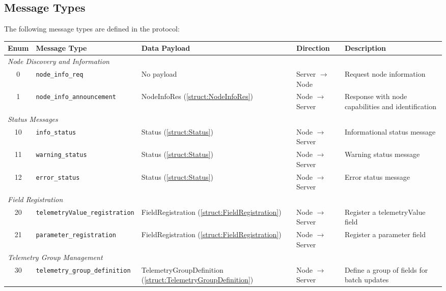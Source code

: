 \begin{landscape}
\pagestyle{landscape}
\section{Message Types}\label{sec:message-types}
The following message types are defined in the protocol:

\begin{center}
\begin{longtable}{c l l l  p{6cm}}
\toprule
\textbf{Enum} & \textbf{Message Type} & \textbf{Data Payload} & \textbf{Direction}&\textbf{Description} \\
\endhead
 
\multicolumn{5}{l}{\textit{Node Discovery and Information}} \\
0 & \texttt{node\_info\_req}\label{msg:node-info-req} & No payload & Server $\rightarrow$ Node & Request node information \\
1 & \texttt{node\_info\_announcement}\label{msg:node-info-announcement} & NodeInfoRes (\ref{struct:NodeInfoRes}) & Node $\rightarrow$ Server & Response with node capabilities and identification \\
\midrule
\multicolumn{5}{l}{\textit{Status Messages}} \\
10 & \texttt{info\_status}\label{msg:info-status} & Status (\ref{struct:Status}) & Node $\rightarrow$ Server & Informational status message \\
11 & \texttt{warning\_status}\label{msg:warning-status} & Status (\ref{struct:Status}) & Node $\rightarrow$ Server & Warning status message \\
12 & \texttt{error\_status}\label{msg:error-status} & Status (\ref{struct:Status}) & Node $\rightarrow$ Server & Error status message \\
\midrule
\multicolumn{5}{l}{\textit{Field Registration}} \\
20 & \texttt{telemetryValue\_registration}\label{msg:telemetryValue-registration} & FieldRegistration (\ref{struct:FieldRegistration}) & Node $\rightarrow$ Server & Register a telemetryValue field \\
21 & \texttt{parameter\_registration}\label{msg:parameter-registration} & FieldRegistration (\ref{struct:FieldRegistration}) & Node $\rightarrow$ Server & Register a parameter field \\
\midrule
\multicolumn{5}{l}{\textit{Telemetry Group Management}} \\
30 & \texttt{telemetry\_group\_definition}\label{msg:parameter-group-definition} & TelemetryGroupDefinition (\ref{struct:TelemetryGroupDefinition}) & Node $\rightarrow$ Server & Define a group of fields for batch updates \\

\end{longtable}
\end{center}
\end{landscape}

